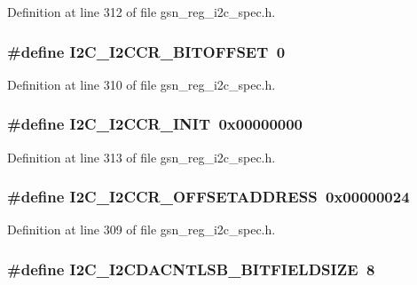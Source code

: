Definition at line 312 of file gsn\_\-reg\_\-i2c\_\-spec.h.

\hypertarget{a00558_a5c6ecafa02f586a1bd1fe8c34f74cc4b}{
\subsubsection[{I2C\_\-I2CCR\_\-BITOFFSET}]{\setlength{\rightskip}{0pt plus 5cm}\#define I2C\_\-I2CCR\_\-BITOFFSET~0}}
\label{a00558_a5c6ecafa02f586a1bd1fe8c34f74cc4b}


Definition at line 310 of file gsn\_\-reg\_\-i2c\_\-spec.h.

\hypertarget{a00558_a71e31a2372cedd463e3bb11ff4807403}{
\subsubsection[{I2C\_\-I2CCR\_\-INIT}]{\setlength{\rightskip}{0pt plus 5cm}\#define I2C\_\-I2CCR\_\-INIT~0x00000000}}
\label{a00558_a71e31a2372cedd463e3bb11ff4807403}


Definition at line 313 of file gsn\_\-reg\_\-i2c\_\-spec.h.

\hypertarget{a00558_a6c2fd3bb081f7b3ff4ef584f1a1c085e}{
\subsubsection[{I2C\_\-I2CCR\_\-OFFSETADDRESS}]{\setlength{\rightskip}{0pt plus 5cm}\#define I2C\_\-I2CCR\_\-OFFSETADDRESS~0x00000024}}
\label{a00558_a6c2fd3bb081f7b3ff4ef584f1a1c085e}


Definition at line 309 of file gsn\_\-reg\_\-i2c\_\-spec.h.

\hypertarget{a00558_a787b1fba1a769c9b4e374185371c5ff3}{
\subsubsection[{I2C\_\-I2CDACNTLSB\_\-BITFIELDSIZE}]{\setlength{\rightskip}{0pt plus 5cm}\#define I2C\_\-I2CDACNTLSB\_\-BITFIELDSIZE~8}}
\label{a00558_a787b1fba1a769c9b4e374185371c5ff3}


